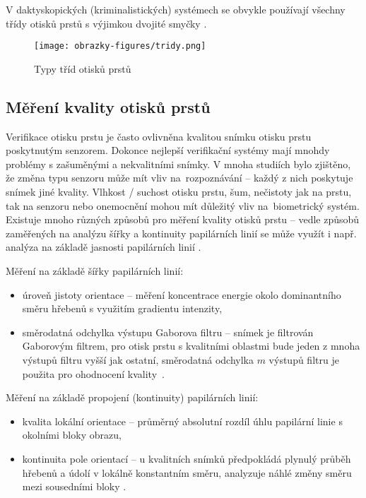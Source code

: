 V daktyskopických (kriminalistických) systémech se obvykle používají všechny třídy otisků prstů s výjimkou dvojité smyčky \cite{BIOopora}. 

\begin{figure}[!htbp]
    \centering
    \texttt{[image: obrazky-figures/tridy.png]}
    \caption{Typy tříd otisků prstů \cite{BIOopora}}
\end{figure}


\subsection*{Měření kvality otisků prstů}
Verifikace otisku prstu je často ovlivněna kvalitou snímku otisku prstu poskytnutým senzorem. Dokonce nejlepší verifikační systémy mají mnohdy problémy s zašuměnými a nekvalitními snímky. V mnoha studiích bylo zjištěno, že změna typu senzoru může mít vliv na~rozpoznávání -- každý z nich poskytuje snímek jiné kvality. Vlhkost / suchost otisku prstu, šum, nečistoty jak na prstu, tak na senzoru nebo onemocnění mohou mít důležitý vliv na~biometrický systém. Existuje mnoho různých způsobů pro měření kvality otisků prstu -- vedle způsobů zaměřených na analýzu šířky a kontinuity papilárních linií se může využít i např. analýza na základě jasnosti papilárních linií \cite{FingerprintQuality}.

Měření na základě šířky papilárních linií:
\begin{itemize}
    \item úroveň jistoty orientace -- měření koncentrace energie okolo dominantního směru hřebenů s využitím gradientu intenzity,
    \item směrodatná odchylka výstupu Gaborova filtru -- snímek je filtrován Gaborovým filtrem, pro otisk prstu s kvalitními oblastmi bude jeden z mnoha výstupů filtru vyšší jak ostatní, směrodatná odchylka $m$ výstupů filtru je použita pro ohodnocení kvality~\cite{FingerprintQuality}.
\end{itemize}

Měření na základě propojení (kontinuity) papilárních linií:
\begin{itemize}
    \item kvalita lokální orientace -- průměrný absolutní rozdíl úhlu papilární linie s okolními bloky obrazu,
    \item kontinuita pole orientací -- u kvalitních snímků předpokládá plynulý průběh hřebenů a údolí v lokálně konstantním směru, analyzuje náhlé změny směru mezi sousedními bloky \cite{FingerprintQuality}.
\end{itemize}




